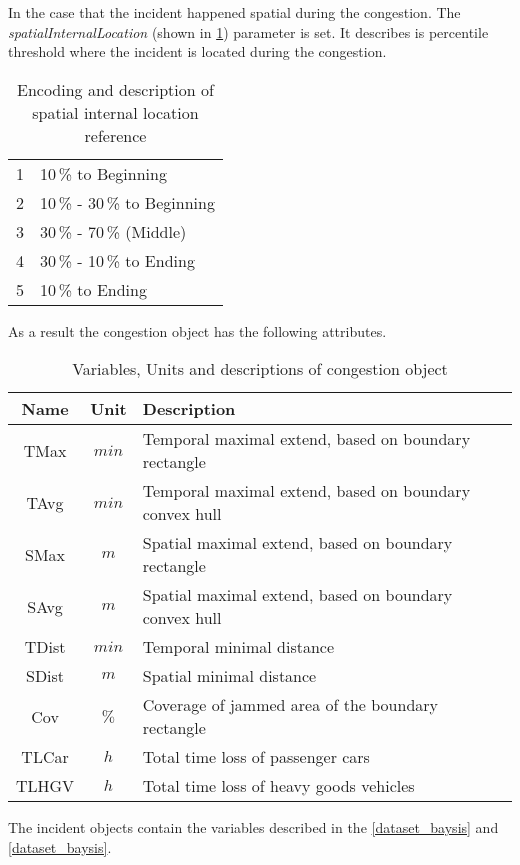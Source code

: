 In the case that the incident happened spatial during the congestion. The \textit{spatialInternalLocation} (shown in \cref{tbl:jam_classification_ILS}) parameter is set. It describes is percentile threshold where the incident is located during the congestion.
\begin{table}[ht!]
	\centering
	\begin{tabular}{c|l}  
		1 & 10\,\% to Beginning \\
 		2 & 10\,\% - 30\,\% to Beginning \\
 		3 & 30\,\% - 70\,\% (Middle) \\
 		4 & 30\,\% - 10\,\% to Ending \\
 		5 & 10\,\% to Ending \\
	\end{tabular}
	\caption{Encoding and description of spatial internal location reference}
	\label{tbl:jam_classification_ILS}
	\vspace{-4mm}
\end{table}
    
As a result the congestion object has the following attributes.
\begin{table}[ht!]
	\centering
	\begin{tabular}{c|c|l} 
		\toprule
		Name & Unit & Description \\
		\midrule 
		TMax  & $min$ & Temporal maximal extend, based on boundary rectangle \\
		TAvg  & $min$ & Temporal maximal extend, based on boundary convex hull \\
		SMax  & $m$   & Spatial maximal extend, based on boundary rectangle \\
		SAvg  & $m$   & Spatial maximal extend, based on boundary convex hull \\
		TDist & $min$ & Temporal minimal distance \\
		SDist & $m$   & Spatial minimal distance \\
		Cov   & $\%$  & Coverage of jammed area of the boundary rectangle \\
		TLCar & $h$   & Total time loss of passenger cars \\
		TLHGV & $h$   & Total time loss of heavy goods vehicles \\
		\bottomrule
	\end{tabular}
	\caption{Variables, Units and descriptions of congestion object}
\end{table}

The incident objects contain the variables described in the \cref{dataset_baysis} and \cref{dataset_baysis}.

